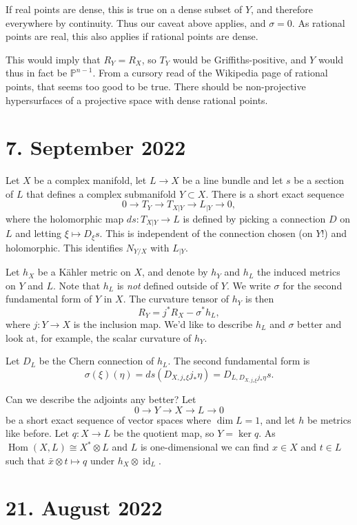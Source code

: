 \documentclass[11pt]{amsart}
\theoremstyle{definition}
\newcommand{\kk}[1]{\mathbb{#1}}
\DeclareMathOperator{\Hom}{Hom}
\DeclareMathOperator{\id}{id}
\begin{document}
If real points are dense, this is true on a dense subset of $Y$, and therefore
everywhere by continuity.
Thus our caveat above applies, and $\sigma = 0$.
As rational points are real, this also applies if rational points are dense.

This would imply that $R_Y = R_X$, so $T_Y$ would be Griffiths-positive, and $Y$
would thus in fact be $\kk P^{n-1}$.
From a cursory read of the Wikipedia page of rational points, that seems too
good to be true. There should be non-projective hypersurfaces of a projective
space with dense rational points.



\section{7. September 2022}

Let $X$ be a complex manifold, let $L \to X$ be a line bundle and let $s$ be a
section of $L$ that defines a complex submanifold $Y \subset X$. There is a
short exact sequence
$$
0 \to T_Y \to T_{X|Y} \to L_{|Y} \to 0,
$$
where the holomorphic map $ds : T_{X|Y} \to L$ is defined by picking a connection $D$
on $L$ and letting $\xi \mapsto D_\xi s$. This is independent of the connection
chosen (on $Y$!) and holomorphic. This identifies $N_{Y/X}$ with $L_{|Y}$.

Let $h_X$ be a K\"ahler metric on $X$, and denote by $h_Y$ and $h_L$ the induced
metrics on $Y$ and $L$. Note that $h_L$ is \emph{not} defined outside of $Y$.
We write $\sigma$ for the second fundamental form of $Y$
in $X$. The curvature tensor of $h_Y$ is then
\[
R_Y = j^* R_X - \sigma^* h_L,
\]
where $j : Y \to X$ is the inclusion map. We'd like to describe $h_L$ and
$\sigma$ better and look at, for example, the scalar curvature of $h_Y$.

Let $D_L$ be the Chern connection of $h_L$. The second fundamental form is
\[
    \sigma(\xi)(\eta)
    = ds(D_{X,j_*\xi} j_* \eta)
    = D_{L,D_{X,j_*\xi} j_* \eta} s.
\]

Can we describe the adjoints any better? Let
$$
0 \to Y \to X \to L \to 0
$$
be a short exact sequence of vector spaces where $\dim L = 1$, and let $h$ be
metrics like before. Let $q : X \to L$ be the quotient map, so $Y = \ker q$.
As $\Hom(X,L) \cong X^* \otimes L$ and $L$ is one-dimensional we can find $x \in
X$ and $t \in L$ such that $\bar x \otimes t \mapsto q$ under $h_X \otimes
\id_L$.

\section{21. August 2022}
\end{document}
